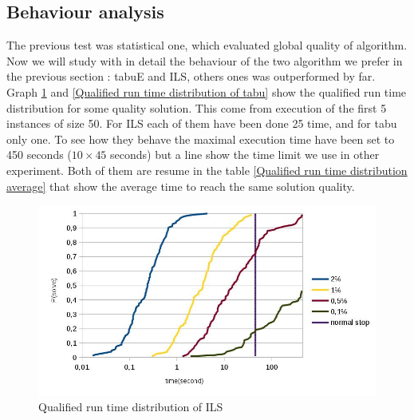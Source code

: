 \documentclass[12pt,a4paper]{article}
\begin{document}
\subsection{Behaviour analysis}

The previous test was statistical one, which evaluated global quality of algorithm. Now we will study with in detail the behaviour of the two algorithm we prefer in the previous section : tabuE and ILS, others ones was outperformed by far.\\

Graph \ref{Qualified run time distribution of ILS} and \ref{Qualified run time distribution of tabu} show the qualified run time distribution for some quality solution. This come from execution of the first 5 instances of size 50. For ILS each of them have been done 25 time, and for tabu only one. To see how they behave the maximal execution time have been set to 450 seconds ($10 \times 45$ seconds) but a line show the time limit we use in other experiment. Both of them are resume in the table \ref{Qualified run time distribution average} that show the average time to reach the same solution quality.

\begin{figure}[!h]
\centering
\includegraphics[scale=0.35]{Qualified_run_time_distribution.jpg}
\caption{Qualified run time distribution of ILS}
\label{Qualified run time distribution of ILS}
\end{figure}
\end{document}
